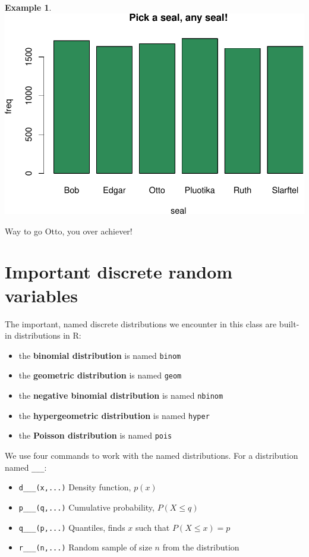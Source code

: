 \documentclass[
]{book}
\providecommand{\tightlist}{%
  \setlength{\itemsep}{0pt}\setlength{\parskip}{0pt}}
\theoremstyle{definition}
\theoremstyle{definition}
\newtheorem{example}{Example}[chapter]
\theoremstyle{definition}
\theoremstyle{definition}
\theoremstyle{remark}
\begin{document}
\begin{example}
\includegraphics{math340-notes_files/figure-latex/unnamed-chunk-142-1.pdf}

Way to go Otto, you over achiever!

\end{example}

\section{Important discrete random variables}\label{r-4distn-functions}

The important, named discrete distributions we encounter in this class are built-in distributions in R:

\begin{itemize}
\tightlist
\item
  the \textbf{binomial distribution} is named \texttt{binom}
\item
  the \textbf{geometric distribution} is named \texttt{geom}
\item
  the \textbf{negative binomial distribution} is named \texttt{nbinom}
\item
  the \textbf{hypergeometric distribution} is named \texttt{hyper}
\item
  the \textbf{Poisson distribution} is named \texttt{pois}
\end{itemize}

We use four commands to work with the named distributions. For a distribution named \texttt{\_\_\_}:

\begin{itemize}
\tightlist
\item
  \texttt{d\_\_\_(x,...)} \textbar{} Density function, \(p(x)\)
\item
  \texttt{p\_\_\_(q,...)} \textbar{} Cumulative probability, \(P(X \leq q)\)
\item
  \texttt{q\_\_\_(p,...)} \textbar{} Quantiles, finds \(x\) such that \(P(X \leq x) = p\)
\item
  \texttt{r\_\_\_(n,...)} \textbar{} Random sample of size \(n\) from the distribution
\end{itemize}
\end{document}
